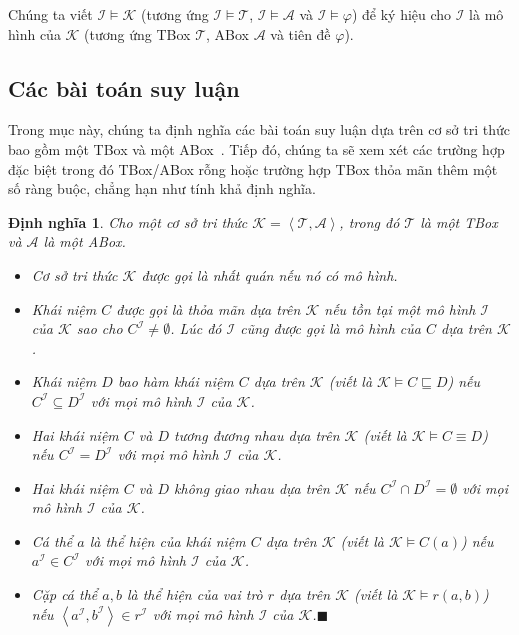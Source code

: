 \documentclass[12pt,a4paper]{report}
\newtheorem{Definition}{Định nghĩa}[chapter]
\newcommand{\myend}{\mbox{}\hfill\mbox{{\scriptsize$\!\blacksquare$}}}
\newcommand{\mT}{\mathcal{T}}
\newcommand{\mA}{\mathcal{A}}
\newcommand{\mI}{\mathcal{I}}
\def\tuple#1{\left\langle#1\right\rangle}
\begin{document}
Chúng ta viết $\mI \models \mathcal{K}$ (tương ứng $\mI \models \mT$, $\mI \models \mA$ và $\mI \models \varphi$) để ký hiệu cho $\mI$ là mô hình của $\mathcal{K}$ (tương ứng TBox $\mT$, ABox $\mA$ và tiên đề $\varphi$).

\subsection{Các bài toán suy luận}\label{subsec:ReasonProb}

Trong mục này, chúng ta định nghĩa các bài toán suy luận dựa trên cơ sở tri thức bao gồm một TBox và một ABox~\cite{ref:Baader01, ref:Baader02, ref:Tobies}. Tiếp đó, chúng ta sẽ xem xét các trường hợp đặc biệt trong đó TBox/ABox rỗng hoặc trường hợp TBox thỏa mãn thêm một số ràng buộc, chẳng hạn như tính khả định nghĩa.

\begin{Definition}\label{def:ReasonPro}
Cho một cơ sở tri thức $\mathcal{K = \tuple{T,A}}$, trong đó $\mT$ là một TBox và $\mA$ là một ABox.
  \begin{itemize}
    \item Cơ sở tri thức $\mathcal{K}$ được gọi là \textnormal{nhất quán} nếu nó có mô hình.

    \item Khái niệm $C$ được gọi là \textnormal{thỏa mãn dựa trên $\mathcal{K}$} nếu tồn tại một mô hình $\mI$ của $\mathcal{K}$ sao cho $C^\mI \neq \emptyset$. Lúc đó $\mI$ cũng được gọi là \textnormal{mô hình} của $C$ dựa trên $\mathcal{K}$.

    \item Khái niệm $D$ \textnormal{bao hàm} khái niệm $C$ dựa trên $\mathcal{K}$ (viết là $\mathcal{K} \models C \sqsubseteq D$) nếu $C^\mI \subseteq D^\mI$ với mọi mô hình $\mI$ của $\mathcal{K}$.

    \item Hai khái niệm $C$ và $D$ \textnormal{tương đương nhau} dựa trên $\mathcal{K}$ (viết là $\mathcal{K} \models C \equiv D$) nếu $C^\mI = D^\mI$ với mọi mô hình $\mI$ của $\mathcal{K}$.

    \item Hai khái niệm $C$ và $D$ \textnormal{không giao nhau} dựa trên $\mathcal{K}$ nếu $C^\mI \cap D^\mI = \emptyset$ với mọi mô hình $\mI$ của $\mathcal{K}$.

    \item Cá thể $a$ là \textnormal{thể hiện của khái niệm} $C$ dựa trên $\mathcal{K}$ (viết là $\mathcal{K} \models C(a)$) nếu $a^\mI \in C^\mI$ với mọi mô hình $\mI$ của $\mathcal{K}$.

    \item Cặp cá thể $a, b$ là \textnormal{thể hiện của vai trò} $r$ dựa trên $\mathcal{K}$ (viết là $\mathcal{K} \models r(a,b)$) nếu $\tuple{a^\mI, b^\mI} \in r^\mI$ với mọi mô hình $\mI$ của $\mathcal{K}$.\myend
  \end{itemize}
\end{Definition}
\end{document}

